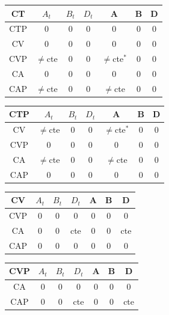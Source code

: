 \documentclass[twocolumn]{article}
\begin{document}
\begin{table}[H]
	\begin{tabular}{|c|c|c|c|c|c|c|}
		\hline
		CT & $A_t$ & $B_t$ & $D_t$ & A & B & D \\
		\hline
		CTP & 0 & 0 & 0 & 0 & 0 & 0\\
		\hline
		CV & 0 & 0 & 0 & 0 & 0 & 0\\
		\hline
		CVP & $\neq$cte & 0 & 0 & $\neq$cte$^\ast$ & 0 & 0\\ %
		\hline
		CA & 0 & 0 & 0 & 0 & 0 & 0\\
		\hline
		CAP & $\neq$cte & 0 & 0 & $\neq$cte & 0 & 0\\
		\hline
	\end{tabular}
\end{table}

\begin{table}[H]
	\begin{tabular}{|c|c|c|c|c|c|c|}
		\hline
		CTP & $A_t$ & $B_t$ & $D_t$ & A & B & D \\
		\hline
		CV & $\neq$cte & 0 & 0 & $\neq$cte$^\ast$ & 0 & 0\\
		\hline %
		CVP & 0 & 0 & 0 & 0 & 0 & 0\\
		\hline
		CA & $\neq$cte & 0 & 0 & $\neq$cte & 0 & 0\\
		\hline
		CAP & 0 & 0 & 0 & 0 & 0 & 0\\
		\hline
	\end{tabular}
\end{table}

\begin{table}[H]
	\begin{tabular}{|c|c|c|c|c|c|c|}
		\hline
		CV & $A_t$ & $B_t$ & $D_t$ & A & B & D \\
		\hline
		CVP & 0 & 0 & 0 & 0 & 0 & 0\\
		\hline
		CA & 0 & 0 & cte & 0 & 0 & cte\\
		\hline
		CAP & 0 & 0 & 0 & 0 & 0 & 0\\
		\hline
	\end{tabular}
\end{table}


\begin{table}[H]
	\begin{tabular}{|c|c|c|c|c|c|c|}
		\hline
		CVP & $A_t$ & $B_t$ & $D_t$ & A & B & D \\
		\hline
		CA & 0 & 0 & 0 & 0 & 0 & 0 \\
		\hline
		CAP & 0 & 0 & cte & 0 & 0 & cte\\
		\hline
	\end{tabular}
\end{table}
\end{document}

